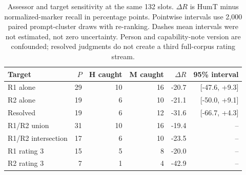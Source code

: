 \begin{table}[htbp]
\centering\small
\caption{Assessor and target sensitivity at the same 132 slots. $\Delta R$ is HumT minus normalized-marker recall in percentage points. Pointwise intervals use 2,000 paired prompt-cluster draws with re-ranking. Dashes mean intervals were not estimated, not zero uncertainty. Person and capability-note version are confounded; resolved judgments do not create a third full-corpus rating stream.}
\label{tab:annotation_sensitivity}
\begin{tabular}{lrrrrr}
\toprule
Target & $P$ & H caught & M caught & $\Delta R$ & 95\% interval \\
\midrule
R1 alone & 29 & 10 & 16 & -20.7 & [-47.6, +9.3] \\
R2 alone & 19 & 6 & 10 & -21.1 & [-50.0, +9.1] \\
Resolved & 19 & 6 & 12 & -31.6 & [-66.7, +4.3] \\
R1/R2 union & 31 & 10 & 16 & -19.4 & -- \\
R1/R2 intersection & 17 & 6 & 10 & -23.5 & -- \\
R1 rating 3 & 15 & 5 & 8 & -20.0 & -- \\
R2 rating 3 & 7 & 1 & 4 & -42.9 & -- \\
\bottomrule
\end{tabular}
\end{table}
